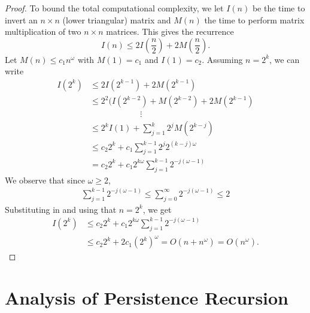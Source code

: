 \documentclass[10pt,a4paper]{article}
\newcommand{\matsize}[2]{#1\times #2}
\newcommand{\matexp}{\omega}
\begin{document}
\begin{proof}
To bound the total computational complexity, we let $I(n)$ be the time to invert an $\matsize{n}{n}$ (lower triangular) matrix and $M(n)$ the time to perform matrix multiplication of two $\matsize{n}{n}$ matrices. This gives the recurrence
 \[I(n) \leq 2 I\left(\frac{n}{2}\right) + 2 M\left(\frac{n}{2}\right).\]
Let  $M(n) \leq c_1 n^{\matexp}$ with $M(1)=c_1$ and $I(1)=c_2$. Assuming $n = 2^{k}$, we can write 
\begin{align*}
 I(2^k) &\leq  2I(2^{k-1}) +2M(2^{k-1})\\
 &\leq  2^2 (I(2^{k-2})+M(2^{k-2}) +2M(2^{k-1})\\
 &\qquad\qquad\qquad\vdots\\
 &\leq  2^k I(1) + \sum\limits_{j=1}^{k}2^jM(2^{k-j})\\
 &\leq  c_2 2^k  + c_1 \sum\limits_{j=1}^{k-1}2^j 2^{(k-j)\matexp}\\
 &=  c_2 2^k  + c_1 2^{k\matexp} \sum\limits_{j=1}^{k-1}2^{-j(\matexp-1)}
 \end{align*}
 We observe that since $\matexp \geq 2$,
 \begin{align*}
 \sum\limits_{j=1}^{k-1}2^{-j(\matexp-1)} \leq  \sum\limits_{j=0}^{\infty}2^{-j(\matexp-1)}  \leq 2
 \end{align*}
 Substituting in and  using that $n=2^k$, we get
 \begin{align*}
 I(2^k) &\leq  c_2 2^k  + c_1 2^{k\matexp} \sum\limits_{j=1}^{k-1}2^{-j(\matexp-1)}\\
 &\leq c_2 2^k  + 2 c_1 (2^k)^\matexp = O(n+ n^\matexp) = O(n^\matexp).
 \end{align*}
 
\end{proof}

\section{Analysis of Persistence Recursion}
\label{appendix:recursion-analysis}
\end{document}
